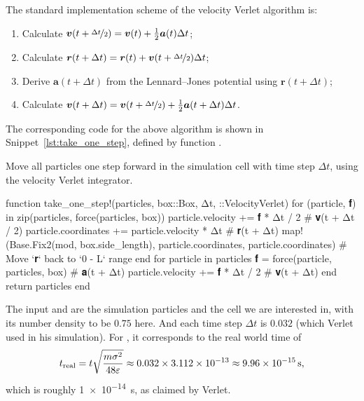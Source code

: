 The standard implementation scheme of the velocity Verlet algorithm is:
%
\begin{enumerate}
    \item Calculate $\bm{v}(t + \nicefrac{\Delta t}{2}) = \bm{v}(t) + \frac{1}{2} \bm{a}(t) \Delta t$;\label{it:vv1}
    \item Calculate $\bm{r}(t + \Delta t) = \bm{r}(t) + \bm{v}(t + \nicefrac{\Delta t}{2}) \Delta t$;\label{it:vv2}
    \item Derive $\bm{a}(t + \Delta t)$ from the Lennard--Jones potential using $\bm{r}(t + \Delta t)$;\label{it:vv3}
    \item Calculate $\bm{v}(t + \Delta t) = \bm{v}(t + \nicefrac{\Delta t}{2}) + \frac{1}{2} \bm{a}(t + \Delta t) \Delta t$.\label{it:vv4}
\end{enumerate}
%
The corresponding code for the above algorithm is shown in Snippet~\ref{lst:take_one_step},
defined by function .
%
\begin{algorithm}
    \caption{Move all particles one step forward in the simulation cell with time step
        $\Delta t$, using the velocity Verlet integrator.}
    \label{lst:take_one_step}
    \begin{juliacode}
        function take_one_step!(particles, box::Box, Δt, ::VelocityVerlet)
            for (particle, 𝐟) in zip(particles, force(particles, box))
                particle.velocity += 𝐟 * Δt / 2  # 𝐯(t + Δt / 2)
                particle.coordinates += particle.velocity * Δt  # 𝐫(t + Δt)
                map!(Base.Fix2(mod, box.side_length), particle.coordinates, particle.coordinates)  # Move `𝐫` back to `0 - L` range
            end
            for particle in particles
                𝐟 = force(particle, particles, box)  # 𝐚(t + Δt)
                particle.velocity += 𝐟 * Δt / 2  # 𝐯(t + Δt)
            end
            return particles
        end
    \end{juliacode}
\end{algorithm}
%
The input  and  are the simulation particles and the cell we
are interested in, with its number density to be $0.75$ here. And each time step
$\Delta t$ is $0.032$ (which Verlet used in his simulation). For , it corresponds
to the real world time of
%
\begin{equation}
    t_\textnormal{real} = t \sqrt{\frac{ m \sigma^2 }{ 48 \varepsilon }}
    \approx 0.032 \times \num{3.112e-13}
    \approx \qty{9.96e-15}{\second},
\end{equation}
%
which is roughly \qty{1e-14}{\second}, as claimed by Verlet\cite{Verlet}.
